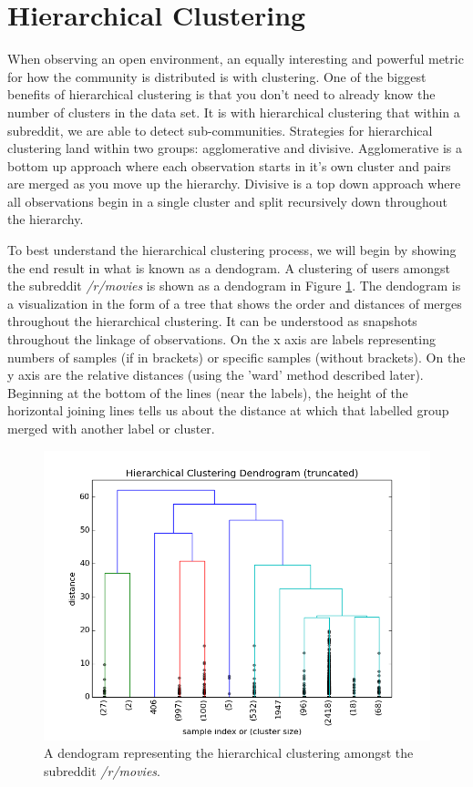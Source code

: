 \documentclass[msc,oneside]{ubcthesis}%
\begin{document}
\section{Hierarchical Clustering}
When observing an open environment, an equally interesting and powerful metric for how the community is distributed is with clustering. One of the biggest benefits of hierarchical clustering is that you don't need to already know the number of clusters in the data set. It is with hierarchical clustering that within a subreddit, we are able to detect sub-communities. Strategies for hierarchical clustering land within two groups: agglomerative and divisive. Agglomerative is a bottom up approach where each observation starts in it's own cluster and pairs are merged as you move up the hierarchy. Divisive is a top down approach where all observations begin in a single cluster and split recursively down throughout the hierarchy. 
\par
To best understand the hierarchical clustering process, we will begin by showing the end result in what is known as a dendogram. A clustering of users amongst the subreddit \textit{/r/movies} is shown as a dendogram in Figure \ref{fig:moviesdend}. The dendogram is a visualization in the form of a tree that shows the order and distances of merges throughout the hierarchical clustering. It can be understood as snapshots throughout the linkage of observations. On the x axis are labels representing numbers of samples (if in brackets) or specific samples (without brackets). On the y axis are the relative distances (using the 'ward' method described later). Beginning at the bottom of the lines (near the labels), the height of the horizontal joining lines tells us about the distance at which that labelled group merged with another label or cluster. 

\begin{figure}[!htb]
\includegraphics[width=\textwidth]{movies_dendogram.png}
\caption[Dendogram of /r/movies]{
A dendogram representing the hierarchical clustering amongst the subreddit \textit{/r/movies}.}
\label{fig:moviesdend}
\end{figure}
\end{document}
